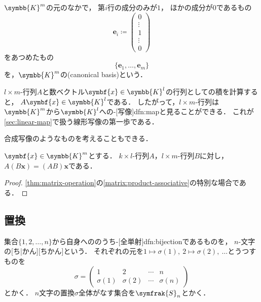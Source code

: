 \documentclass[../sotsu.tex]{subfiles}
\begin{document}
\begin{definition}
    \label{dfn:canonical-basis-of-coordinate-space}
    $\symbb{K}^m$の元のなかで，
    第$i$行の成分のみが$1$，
    ほかの成分が$0$であるもの
    \begin{equation*}
        \symbf{e}_i
            \coloneq
            \begin{pmatrix}
                0  \\  \vdots  \\  1  \\  \vdots  \\  0
            \end{pmatrix}
    \end{equation*}
    をあつめたもの
    \begin{equation*}
        \{  \symbf{e}_1, \dots, \symbf{e}_m  \}
    \end{equation*}
    を，$\symbb{K}^m$の(canonical basis)という．
\end{definition}

$l \times m$-行列$A$と数ベクトル$\symbf{x} \in \symbb{K}^l$の行列としての積を計算すると，
$A\symbf{x} \in \symbb{K}^l$である．
したがって，$l \times m$-行列は$\symbb{K}^m$から$\symbb{K}^l$への-[写像]{dfn:map}と見ることができる．
これが\cref{sec:linear-map}で扱う線形写像の第一歩である．

合成写像のようなものを考えることもできる．

\begin{corollary}
    \label{thm:composition-of-transformation-of-Euclidean-vector}
    $\symbf{x} \in \symbb{K}^m$とする．
    $k \times l$-行列$A$，$l \times m$-行列$B$に対し，
    $A(B\symbf{x}) = (AB)\symbf{x}$である．
\end{corollary}

\begin{proof}
    \cref{thm:matrix-operation}の\cref{matrix:product-associative}の特別な場合である．
\end{proof}



\subsection{置換}

\begin{definition}
    \label{dfn:permutation}
    集合$\{ 1, 2, \dots, n \}$から自身へののうち-[全単射]{dfn:bijection}であるものを，
    $n$-文字の[ち|かん][ちかん]という．
    それぞれの元を$1 \mapsto \sigma(1), \  2 \mapsto \sigma(2), \  \dotsc$とうつすものを
    \begin{equation*}
        \sigma = 
        \begin{pmatrix}
                   1  &        2  & \cdots &        n  \\
            \sigma(1) & \sigma(2) & \cdots & \sigma(n)
        \end{pmatrix}
    \end{equation*}
    とかく．
    $n$文字の置換$\sigma$全体がなす集合を$\symfrak{S}_n$とかく．
\end{definition}
\end{document}
